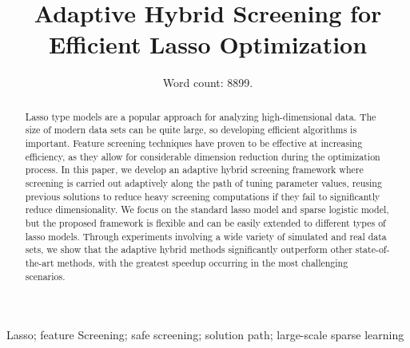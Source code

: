 \documentclass[]{interact}
\title{Adaptive Hybrid Screening for Efficient Lasso Optimization}
\author{Word count: 8899.}
\date{}
\theoremstyle{plain}%
\theoremstyle{definition}
\theoremstyle{remark}
\begin{document}
\maketitle


\begin{abstract}
Lasso type models are a popular approach for analyzing high-dimensional data. The size of modern data sets can be quite large, so developing efficient algorithms is important. Feature screening techniques have proven to be effective at increasing efficiency, as they allow for considerable dimension reduction during the optimization process. In this paper, we develop an adaptive hybrid screening framework where screening is carried out adaptively along the path of tuning parameter values, reusing previous solutions to reduce heavy screening computations if they fail to significantly reduce dimensionality. We focus on the standard lasso model and sparse logistic model, but the proposed framework is flexible and can be easily extended to different types of lasso models. Through experiments involving a wide variety of simulated and real data sets, we show that the adaptive hybrid methods significantly outperform other state-of-the-art methods, with the greatest speedup occurring in the most challenging scenarios.
\end{abstract}

\begin{keywords}
Lasso; feature Screening; safe screening; solution path; large-scale sparse learning
\end{keywords}





\end{document}
